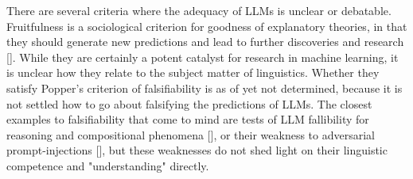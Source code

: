There are several criteria where the adequacy of LLMs is unclear or debatable. Fruitfulness is a sociological criterion for goodness of explanatory theories, in that they should generate new predictions and lead to further discoveries and research []. While they are certainly a potent catalyst for research in machine learning, it is unclear how they relate to the subject matter of linguistics. Whether they satisfy Popper's criterion of falsifiability is as of yet not determined, because it is not settled how to go about falsifying the predictions of LLMs. The closest examples to falsifiability that come to mind are tests of LLM fallibility for reasoning and compositional phenomena [], or their weakness to adversarial prompt-injections [], but these weaknesses do not shed light on their linguistic competence and "understanding" directly.\\


